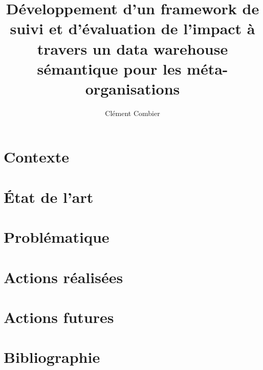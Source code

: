 \documentclass[empty]{fjc2014} %
\title[fjc]{Développement d'un framework de suivi et d'évaluation de l'impact à travers un data warehouse sémantique pour les méta-organisations}
\author{Clément Combier}
\begin{document}
\maketitlepage
\section{Contexte}


\section{État de l'art}


\section{Problématique}


\section{Actions réalisées}



\section{Actions futures}


\section*{Bibliographie}


\end{document}
